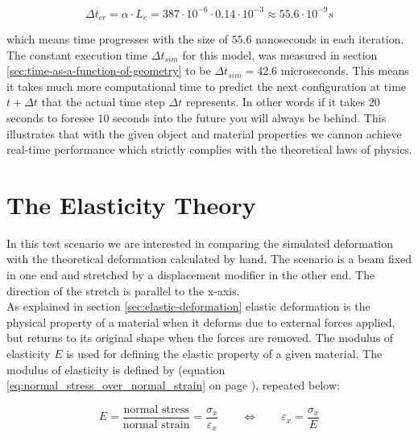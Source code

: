 \begin{equation}
\Delta t_{cr} = \alpha \cdot L_e
= 387 \cdot 10^{-6}
\cdot 0.14 \cdot 10^{-3}
\approx 55.6 \cdot 10^{-9}s
\end{equation}

which means time progresses with the size of $55.6$ nanoseconds in
each iteration.
%
The constant execution time $\Delta t_{sim}$ for this model, was
measured in section \vref{sec:time-as-a-function-of-geometry} to be
$\Delta t_{sim}= 42.6$ microseconds. This means it takes much more
computational time to predict the next configuration at time $t +
\Delta t$ that the actual time step $\Delta t$ represents. In other
words if it takes $20$ seconds to foresee $10$ seconds into the future
you will always be behind. This illustrates that with the given object
and material properties we cannon achieve real-time performance which
strictly complies with the theoretical laws of physics.


\section{The Elasticity Theory}
\label{sec:results_elastic_theory}
In this test scenario we are interested in comparing the simulated
deformation with the theoretical deformation calculated
by hand. The scenario is a beam fixed in one end and stretched by a
displacement modifier in the other end. The direction of the stretch 
is parallel to the x-axis. \\

As explained in section \vref{sec:elastic-deformation} elastic
deformation is the physical 
property of a material when it 
deforms due to external forces applied, but returns to its original
shape when the forces are removed. The modulus of elasticity $E$ is used
for defining the elastic property of a given material. The modulus of
elasticity is defined by (equation
\ref{eq:normal_stress_over_normal_strain} on page
\pageref{eq:normal_stress_over_normal_strain}), repeated below:

\begin{equation*}
  E =  \frac{\mbox{normal stress}}{\mbox{normal strain}}
  = \frac{\sigma_x}{\varepsilon_x}
  \qquad \Leftrightarrow \qquad
  \varepsilon_x = \frac{\sigma_x}{E}
\end{equation*}

